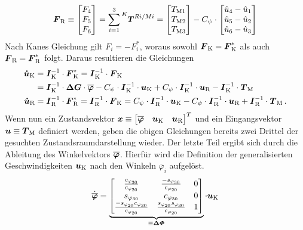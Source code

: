 \begin{equation}
\bs{F}\idx{R} \equiv \begin{bmatrix} F\idx4 \\ F\idx5 \\ F\idx6 \end{bmatrix} = \sum^3_{i=1} \presuper{K}{\bs{T}^{Ri/Mi}} = \begin{bmatrix}
T\idx{M1} \\ T\idx{M2} \\ T\idx{M3}
\end{bmatrix} - C_{\psi}\cdot \begin{bmatrix}
\hat{u}\idx4 - \hat{u}\idx1 \\ \hat{u}\idx5 - \hat{u}\idx2 \\ \hat{u}\idx6 - \hat{u}\idx3
\end{bmatrix}
\end{equation}
Nach Kanes Gleichung gilt $F_i=-F^*_i$, woraus sowohl $\boldsymbol{F}_{\text{K}}=\boldsymbol{F}^*_{\text{K}}$ als auch $\boldsymbol{F}_{\text{R}}=\boldsymbol{F}^*_{\text{R}}$ folgt. Daraus resultieren die Gleichungen
\begin{align}
\label{eq_ZRD3D_zeile2}
\boldsymbol{\dot{u}}_{\text{K}} &= \boldsymbol{I}^{-1}_{\text{K}} \cdot \boldsymbol{F}^*_{\text{K}} = \boldsymbol{I}^{-1}_{\text{K}} \cdot \boldsymbol{F}_{\text{K}} 
\\
&= \boldsymbol{I}^{-1}_{\text{K}} \cdot \boldsymbol{\Delta G} \cdot \boldsymbol{\overline{\varphi}} - C_{\psi}\cdot \boldsymbol{I}^{-1}_{\text{K}} \cdot \boldsymbol{u}_{\text{K}} + C_{\psi}\cdot \boldsymbol{I}^{-1}_{\text{K}} \cdot \boldsymbol{u}_{\text{R}} - \boldsymbol{I}^{-1}_{\text{K}} \cdot \boldsymbol{T}_{\text{M}} \nonumber
\\
\label{eq_ZRD3D_zeile3}
\boldsymbol{\dot{u}}_{\text{R}} &= \boldsymbol{I}^{-1}_{\text{R}} \cdot \boldsymbol{F}^*_{\text{R}} = \boldsymbol{I}^{-1}_{\text{R}} \cdot \boldsymbol{F}_{\text{K}} =
 C_{\psi}\cdot \boldsymbol{I}^{-1}_{\text{R}} \cdot \boldsymbol{u}_{\text{K}} - C_{\psi}\cdot \boldsymbol{I}^{-1}_{\text{R}} \cdot \boldsymbol{u}_{\text{R}} + \boldsymbol{I}^{-1}_{\text{R}} \cdot \boldsymbol{T}_{\text{M}} \,.
\end{align}
Wenn nun ein Zustandsvektor $\boldsymbol{x} \equiv \begin{bmatrix} \boldsymbol{\overline{\varphi}} & \boldsymbol{u}_{\text{K}} & \boldsymbol{u}_{\text{R}}\end{bmatrix}^T$ und ein Eingangsvektor $\boldsymbol{u} \equiv \boldsymbol{T}_{\text{M}}$ definiert werden, geben die obigen Gleichungen bereits zwei Drittel der gesuchten Zustandsraumdarstellung wieder. Der letzte Teil ergibt sich durch die Ableitung des Winkelvektors $\boldsymbol{\overline{\varphi}}$. Hierfür wird die Definition der generalisierten Geschwindigkeiten $\boldsymbol{u}_{\text{K}}$ nach den Winkeln ${\overline{\varphi}}_i$ aufgelöst.
\begin{equation}
\label{eq_ZRD3D_zeile1}
\dot{\boldsymbol{\overline{\varphi}}} = \underbrace{\begin{bmatrix}
\frac{c_{\varphi_{\text{30}}}}{c_{\varphi_{\text{20}}}} & \frac{-s_{\varphi_{\text{30}}}}{c_{\varphi_{\text{20}}}} & 0 
\\
s_{\varphi_{\text{30}}} & c_{\varphi_{\text{30}}} & 0 
\\
\frac{-s_{\varphi_{\text{20}}}c_{\varphi_{\text{30}}}}{c_{\varphi_{\text{20}}}} &
\frac{s_{\varphi_{\text{20}}}s_{\varphi_{\text{30}}}}{c_{\varphi_{\text{20}}}} & 1
\end{bmatrix}}_{\equiv \boldsymbol{\Delta\varPhi}}\cdot \boldsymbol{u}_{\text{K}}
\end{equation}
